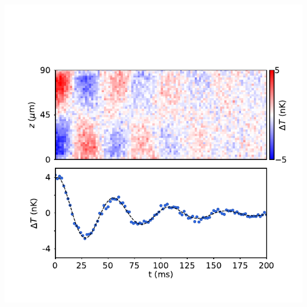 \documentclass[26pt, paperwidth=36in,paperheight=48in]{tikzposter} %
\begin{document}
\begin{columns}
{\begin{minipage}{0.2\textwidth}
			\includegraphics[width=17cm,
			trim=0cm 0cm 0cm 9.67cm,clip]{figures/TimeEvolution_Slides_noedge.pdf}\\
			

\end{minipage}}
\end{columns}
\end{document}
